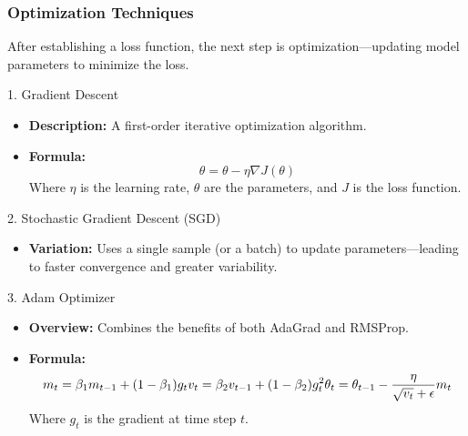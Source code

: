 \documentclass[aspectratio=169]{beamer}
\begin{document}
\begin{frame}[fragile]
    \frametitle{Optimization Techniques}
    After establishing a loss function, the next step is optimization—updating model parameters to minimize the loss.

    \begin{block}{1. Gradient Descent}
        \begin{itemize}
            \item \textbf{Description:} A first-order iterative optimization algorithm.
            \item \textbf{Formula:}
            \begin{equation}
            \theta = \theta - \eta \nabla J(\theta)
            \end{equation}
            Where \(\eta\) is the learning rate, \(\theta\) are the parameters, and \(J\) is the loss function.
        \end{itemize}
    \end{block}
    
    \begin{block}{2. Stochastic Gradient Descent (SGD)}
        \begin{itemize}
            \item \textbf{Variation:} Uses a single sample (or a batch) to update parameters—leading to faster convergence and greater variability.
        \end{itemize}
    \end{block}
    
    \begin{block}{3. Adam Optimizer}
        \begin{itemize}
            \item \textbf{Overview:} Combines the benefits of both AdaGrad and RMSProp.
            \item \textbf{Formula:}
            \begin{equation}
            m_t = \beta_1 m_{t-1} + (1 - \beta_1)g_t \\
            v_t = \beta_2 v_{t-1} + (1 - \beta_2)g_t^2 \\
            \theta_t = \theta_{t-1} - \frac{\eta}{\sqrt{v_t} + \epsilon} m_t
            \end{equation}
            Where \(g_t\) is the gradient at time step \(t\).
        \end{itemize}
    \end{block}
\end{frame}
\end{document}
